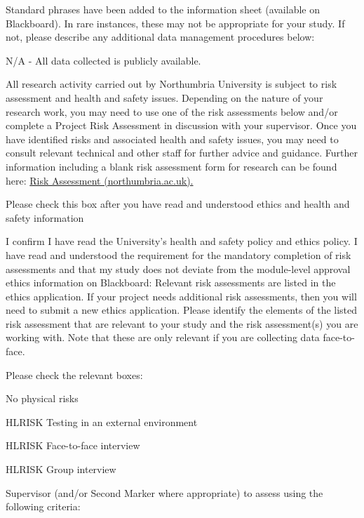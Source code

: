 \documentclass[../CHEFCookingHelperForEveryonesFridge.tex]{subfiles}
\begin{document}
Standard phrases have been added to the information sheet (available on Blackboard). In rare instances,
these may not be appropriate for your study. If not,
please describe any additional data management procedures below:

N/A - All data collected is publicly available.

All research activity carried out by Northumbria University is subject to risk assessment and health and safety
issues. Depending on the nature of your research work, you may need to use one of the risk assessments below
and/or complete a Project Risk Assessment in discussion with your supervisor. Once you have identified risks
and associated health and safety issues, you may need to consult relevant technical and other staff for further
advice and guidance. Further information including a blank risk assessment form for research can be found here:
\href{https://www.northumbria.ac.uk/about-us/health-safety-resources/risk-assessment/}{Risk Assessment (northumbria.ac.uk).}

Please check this box after you have read and understood ethics and health and safety information

   I confirm I have read the University's health and safety policy and ethics policy.
I have read and understood the requirement for the mandatory completion of risk assessments and that my study
does not deviate from the module-level approval ethics information on Blackboard: Relevant risk assessments
are listed in the ethics application. If your project needs additional risk assessments, then you will need
to submit a new ethics application. Please identify the elements of the listed risk assessment that are relevant
to your study and the risk assessment(s) you are working with. Note that these are only relevant if you are
collecting data face-to-face.

Please check the relevant boxes:

   No physical risks

   HL\textunderscore RISK Testing in an external environment

   HL\textunderscore RISK Face-to-face interview

   HL\textunderscore RISK Group interview

Supervisor (and/or Second Marker where appropriate) to assess using the following criteria:
\end{document}
